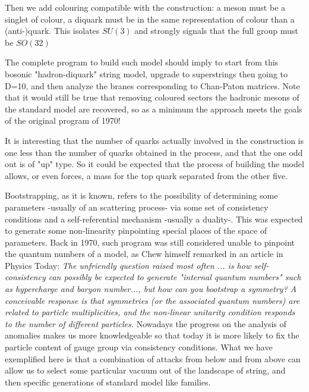 \documentclass[a4paper]{article}
\begin{document}
Then we add colouring compatible with the construction: a meson must be 
a singlet of colour, a diquark must be in the same representation
of colour than a (anti-)quark. This isolates $SU(3)$ and strongly signals
that the full group must be $SO(32)$

The complete program to build such model should imply to start from
this bosonic "hadron-diquark" string model, upgrade to superstrings
then going to D=10, and then analyze the branes corresponding to
Chan-Paton matrices. Note that it would still be true that 
removing coloured sectors the hadronic mesons of the standard
model are recovered, so as a minimum the approach meets the
goals of the original program of 1970!

It is interesting that the number of quarks actually involved in 
the construction is one less than the number of quarks obtained
in the process, and that the one odd out is of "up" type. So it could
be expected that the process of building the model allows, or 
even forces, a mass for the top quark separated from
the other five.

Bootstrapping, as it is known, refers to the possibility of determining
some parameters -usually of an scattering process- via some set of consistency 
conditions and a self-referential mechanism -usually a duality-. This was
expected to generate some non-linearity pinpointing special places of the
space of parameters. Back in 1970, such program was still considered unable to pinpoint the
quantum numbers of a model, as Chew himself remarked in an article
in Physics Today:
{\it The unfriendly question raised most
often ... is how self-consistency can possibly be expected to generate "internal quantum numbers" such as hypercharge and baryon number..., but how can you bootstrap a symmetry? A conceivable response is that symmetries (or the associated quantum numbers) are related to particle multiplicities, and the non-linear unitarity condition responds to the number of different particles.} 
Nowadays the progress on the analysis of anomalies makes us more
knowledgeable so that today it is more likely 
to fix the particle content of gauge group via consistency conditions. What we have
exemplified here is that a combination of attacks from below and from above
can allow us to select some particular vacuum out of the landscape of 
string, and then specific generations of standard model like families. 
\end{document}
